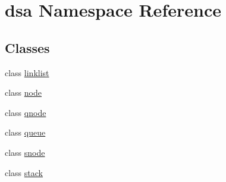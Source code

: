 \hypertarget{namespacedsa}{}\section{dsa Namespace Reference}
\label{namespacedsa}
\subsection*{Classes}
\begin{DoxyCompactItemize}
\item 
class \hyperlink{classdsa_1_1linklist}{linklist}
\item 
class \hyperlink{classdsa_1_1node}{node}
\item 
class \hyperlink{classdsa_1_1qnode}{qnode}
\item 
class \hyperlink{classdsa_1_1queue}{queue}
\item 
class \hyperlink{classdsa_1_1snode}{snode}
\item 
class \hyperlink{classdsa_1_1stack}{stack}
\end{DoxyCompactItemize}
